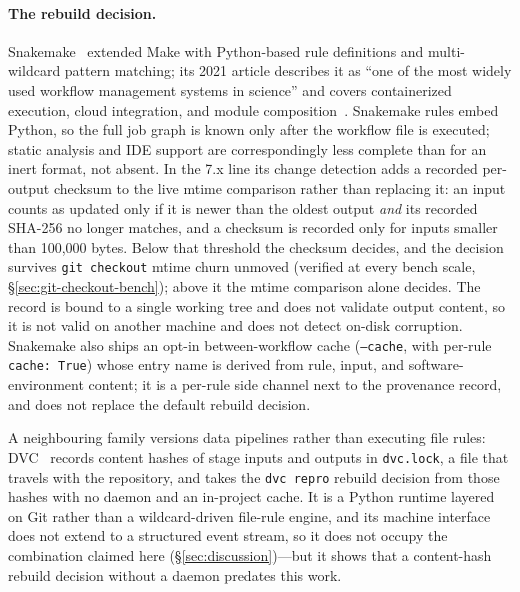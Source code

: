 \documentclass[12pt,a4paper]{article}
\newcommand{\code}[1]{{\texttt{\small\color{inlinecode}#1}}}
\begin{document}
\paragraph{The rebuild decision.}
Snakemake~\cite{kosterSnakemakeScalableBioinformatics2012} extended Make
with Python-based rule definitions and multi-wildcard pattern matching;
its 2021 article describes it as ``one of the most widely used workflow
management systems in science'' and covers containerized execution,
cloud integration, and module
composition~\cite{molderSustainableDataAnalysis2021}. Snakemake rules
embed Python, so the full job graph is known only after the workflow
file is executed; static analysis and IDE support are correspondingly
less complete than for an inert format, not absent. In the 7.x line its
change detection adds a recorded per-output checksum to the live mtime
comparison rather than replacing it: an input counts as updated only if
it is newer than the oldest output \emph{and} its recorded SHA-256 no
longer matches, and a checksum is recorded only for inputs smaller than
100{,}000 bytes. Below that threshold the checksum decides, and the
decision survives \code{git checkout} mtime churn unmoved (verified at
every bench scale, \S\ref{sec:git-checkout-bench}); above it the mtime
comparison alone decides. The record is bound to a single
working tree and does not validate output content, so it
is not valid on another machine and does not detect on-disk corruption.
Snakemake also ships an opt-in between-workflow cache (\code{--cache},
with per-rule \code{cache: True}) whose entry name is derived from
rule, input, and software-environment content; it is a per-rule side
channel next to the provenance record, and does not replace the
default rebuild decision.

A neighbouring family versions data pipelines rather than executing
file rules: DVC~\cite{dvc} records content hashes of stage inputs and
outputs in \code{dvc.lock}, a file that travels with the repository,
and takes the \code{dvc repro} rebuild decision from those hashes with
no daemon and an in-project cache. It is a Python runtime layered on
Git rather than a wildcard-driven file-rule engine, and its machine
interface does not extend to a structured event stream, so it does not
occupy the combination claimed here
(\S\ref{sec:discussion})---but it shows that a content-hash
rebuild decision without a daemon predates this work.
\end{document}

